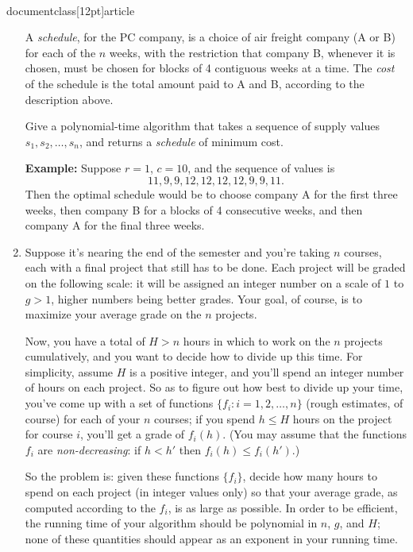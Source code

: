 \\documentclass[12pt]{article}
\def\gap{0.2in}
\begin{document}
\begin{enumerate}
A {\em schedule}, for the PC company, is a choice of
air freight company (A or B) for each of the $n$ weeks,
with the restriction that company B, whenever it is chosen,
must be chosen for blocks of 4 contiguous weeks at a time.
The {\em cost} of the schedule is the total amount
paid to A and B, according to the description above.

\vskip \gap
Give a polynomial-time algorithm that
takes a sequence of supply values $s_1, s_2, \ldots, s_n$,
and returns a {\em schedule} of minimum cost.

\vskip \gap
{\bf Example:} Suppose $r = 1$, $c = 10$, and
the sequence of values is $$11, 9, 9, 12, 12, 12, 12, 9, 9, 11.$$
Then the optimal schedule would be to choose company A
for the first three weeks,
then company B for a blocks of 4 consecutive weeks,
and then company A for the final three weeks.


\item

Suppose it's nearing the end of the semester and
you're taking $n$ courses, each with a final project
that still has to be done.
Each project will be graded on the following scale:
it will be assigned an integer number on a scale of $1$ to $g > 1$,
higher numbers being better grades.
Your goal, of course, is to maximize your average grade
on the $n$ projects.

Now, you have a total of $H > n$ hours in which to work on
the $n$ projects cumulatively,
and you want to decide how to divide up this time.
For simplicity, assume $H$ is a positive integer, and you'll
spend an integer number of hours on each project.
So as to figure out how best to divide up your time,
you've come up with a set of functions $\{f_i : i = 1, 2, \ldots, n\}$
(rough estimates, of course) for each of your $n$ courses;
if you spend $h \leq H$ hours on the project for course $i$,
you'll get a grade of $f_i(h)$.
(You may assume that the functions $f_i$ are {\em non-decreasing}:
if $h < h'$ then $f_i(h) \leq f_i(h')$.)

So the problem is: given these functions $\{f_i\}$,
decide how many hours to spend on each project (in integer values only)
so that your average grade, as computed according to the $f_i$,
is as large as possible.
In order to be efficient, the running time of your
algorithm should be polynomial in $n$, $g$, and $H$; none of these
quantities should appear as an exponent in your running time.


\end{enumerate}
\end{document}
